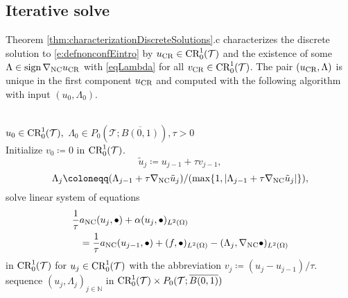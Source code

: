 \subsection{Iterative solve}
Theorem
\ref{thm:characterizationDiscreteSolutions}.c
characterizes the discrete solution to  
\eqref{e:defnonconfEintro} 
by $u_{\textup{CR}}\in\textup{CR}^1_0(\mathcal T)$ and 
the existence of some 
$
  \Lambda\in\operatorname{sign}\nabla_{\textup{NC}}u_{\textup{CR}}
$ 
with \eqref{eqLambda}
for all $v_{\textup{CR}}\in\textup{CR}^1_0(\mathcal{T})$.
The pair $(u_\textup{CR},\Lambda)$ is unique in the first component $u_\textup{CR}$
and computed with the following algorithm with input $(u_0,\Lambda_0)$.


\begin{algorithm}\label{alg:PrimalDualIteration}
\begin{algorithmic}\\
  \Require $u_0\in\textup{CR}_0^1(\mathcal{T}),$
  $\Lambda_0\in P_0(\mathcal{T};
  \overline{B(0,1)}),\tau>0$  \\
  Initialize $v_0\coloneqq 0$ in $\textup{CR}^1_0(\mathcal T)$.
  \begin{equation}
    \label{equ:PrimalDualAlgUj}
    \tilde{u}_j\coloneqq u_{j-1}+\tau v_{j-1},
  \end{equation}
  \begin{equation}
    \label{equ:PrimalDualAlgLambdaJ}
    \Lambda_j\coloneqq
    (\Lambda_{j-1}+\tau\nabla_{\textup{NC}} \tilde{u}_j)/
      (\operatorname{max}\{1,|\Lambda_{j-1}+\tau\nabla_{\textup{NC}}\tilde{u}_j|\}),
  \end{equation}
      \State
  \State solve linear system of equations
  \begin{align}
    \label{equ:linSysPrimalDualAlg}
    \frac{1}{\tau}&a_{\textup{NC}}(u_j,\bullet)+\alpha(u_j,\bullet)_{L^2(\Omega)}
    \notag \\
    &=
    \frac{1}{\tau}a_{\textup{NC}}(u_{j-1},\bullet) + (f,\bullet)_{L^2(\Omega)}
    - (\Lambda_j,\nabla_{\textup{NC}}\bullet)_{L^2(\Omega)} 
  \end{align}
in $\textup{CR}^1_0(\mathcal{T})$ for $u_j\in\textup{CR}^1_0(\mathcal{T})$
with the abbreviation
$v_j\coloneqq(u_j-u_{j-1})/\tau$.\\
  \EndFor
  \Ensure sequence $(u_j,\Lambda_j)_{j\in\mathbb N}$ in $\textup{CR}^1_0(\mathcal{T})\times
  P_0(\mathcal{T};\overline{B(0,1)})$   
  \end{algorithmic}
\end{algorithm}

